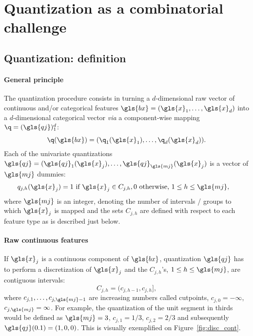  
\section{Quantization as a combinatorial challenge} \label{sec:model_selection}

\subsection{Quantization: definition}

\paragraph{General principle}

The quantization procedure consists in turning a $d$-dimensional raw vector of continuous and/or categorical features $\gls{bx} = (\gls{x}_1, \ldots, \gls{x}_d)$ into a $d$-dimensional categorical vector \textit{via} a component-wise mapping $\q=(\gls{qj})_1^d$:
\[\q(\gls{bx})=(\q_1(\gls{x}_1),\ldots,\q_d(\gls{x}_d)).\]
Each of the univariate quantizations $\gls{qj} = (\gls{qj}_1(\gls{x}_j), \dots, \gls{qj}_{\gls{mj}}(\gls{x}_j)$ is a vector of $\gls{mj}$ dummies: 
\begin{align}\label{eq:qj}
& q_{j,h}(\gls{x}_j) =  1 \text{ if } \gls{x}_j \in C_{j,h}, 0 \text{ otherwise, } 1 \leq h \leq \gls{mj},
\end{align}
where $\gls{mj}$ is an integer, denoting the number of intervals / groups to which $\gls{x}_j$ is mapped
and the sets $C_{j,h}$ are defined with respect to each feature type as is described just below.
\paragraph{Raw continuous features} If $\gls{x}_j$ is a continuous component of $\gls{bx}$, quantization $\gls{qj}$ has to perform a discretization of $\gls{x}_j$ and the $C_{j,h}$'s, $1 \leq h \leq \gls{mj}$, are contiguous intervals:
\begin{equation}\label{eq:Cjhcont}
C_{j,h}=(c_{j,h-1},c_{j,h}],
\end{equation}
where $c_{j,1},\ldots,c_{j,\gls{mj}-1}$ are increasing numbers called cutpoints, $c_{j,0}=-\infty$, $c_{j,\gls{mj}}=\infty$. For example, the quantization of the unit segment in thirds would be defined as $\gls{mj}=3$, $c_{j,1} = 1/3$, $c_{j,2} = 2/3$ and subsequently $\gls{qj}(0.1) = (1,0,0)$. This is visually exemplified on Figure~\ref{fig:disc_cont}.
